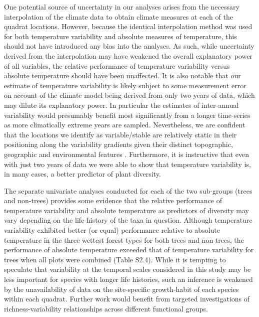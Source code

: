 One potential source of uncertainty in our analyses arises from the necessary interpolation of the climate data to obtain climate measures at each of the quadrat locations. However, because the identical interpolation method was used for both temperature variability and absolute measures of temperature, this should not have introduced any bias into the analyses. As such, while uncertainty derived from the interpolation may have weakened the overall explanatory power of all variables, the relative performance of temperature variability versus absolute temperature should have been unaffected. It is also notable that our estimate of temperature variability is likely subject to some measurement error on account of the climate model being derived from only two years of data, which may dilute its explanatory power. In particular the estimates of inter-annual variability would presumably benefit most significantly from a longer time-series as more climatically extreme years are sampled. Nevertheless, we are confident that the locations we identify as variable/stable are relatively static in their positioning along the variability gradients given their distinct topographic, geographic and environmental features \citep{Ashcroft2012b}. Furthermore, it is instructive that even with just two years of data we were able to show that temperature variability is, in many cases, a better predictor of plant diversity.

The separate univariate analyses conducted for each of the two sub-groups (trees and non-trees) provides some evidence that the relative performance of temperature variability and absolute temperature as predictors of diversity may vary depending on the life-history of the taxa in question. Although temperature variability exhibited better (or equal) performance relative to absolute temperature in the three wettest forest types for both trees and non-trees, the performance of absolute temperature exceeded that of temperature variability for trees when all plots were combined (Table S2.4). While it is tempting to speculate that variability at the temporal scales considered in this study may be less important for species with longer life histories, such an inference is weakened by the unavailability of data on the site-specific growth-habit of each species within each quadrat. Further work would benefit from targeted investigations of richness-variability relationships across different functional groups.

